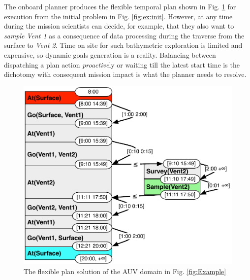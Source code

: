 The onboard planner produces the flexible temporal plan shown in
Fig. \ref{fig:ex:plan} for execution from the initial problem in
Fig. \ref{fig:ex:init}. However, at any time during the mission
scientists can decide, for example, that they also want to {\em
  sample} {\em Vent 1} as a consequence of data processing during the
traverse from the surface to {\em Vent 2}.  Time on site for such
bathymetric exploration is limited and expensive, so dynamic goals
generation is a reality.  Balancing between dispatching a plan action
\emph{proactive}ly or waiting till the latest start time is the
dichotomy with consequent mission impact is what the planner needs to
resolve.


\begin{figure}[!htb]
  \centering
  \includegraphics[width=0.8\columnwidth]{figs/example_plan}
  \caption{\small The flexible plan solution of the AUV domain in
    Fig. \ref{fig:Example}}
  \label{fig:ex:plan}
\end{figure}


